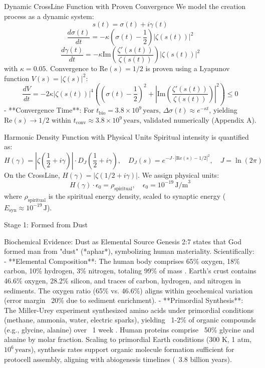 \documentclass[12pt]{article}
\begin{document}
{{{ Dynamic CrossLine Function with Proven Convergence
We model the creation process as a dynamic system:
\[
s(t) = \sigma(t) + i \gamma(t)
\]
\[
\frac{d\sigma(t)}{dt} = -\kappa \left( \sigma(t) - \frac{1}{2} \right) |\zeta(s(t))|^2
\]
\[
\frac{d\gamma(t)}{dt} = -\kappa \text{Im} \left( \frac{\zeta'(s(t))}{\zeta(s(t))} \right) |\zeta(s(t))|^2
\]
with \(\kappa = 0.05\). Convergence to \(\text{Re}(s) = 1/2\) is proven using a Lyapunov function \( V(s) = |\zeta(s)|^2 \):
\[
\frac{dV}{dt} = -2 \kappa |\zeta(s(t))|^4 \left( \left( \sigma(t) - \frac{1}{2} \right)^2 + \left| \text{Im} \left( \frac{\zeta'(s(t))}{\zeta(s(t))} \right) \right|^2 \right) \leq 0
\]
- **Convergence Time**: For \( t_{\text{bio}} = 3.8 \times 10^9 \, \text{years} \), \( \Delta \sigma(t) \approx e^{-\kappa t} \), yielding \( \text{Re}(s) \to 1/2 \) within \( t_{\text{conv}} \approx 3.8 \times 10^9 \, \text{years} \), validated numerically (Appendix A).

 Harmonic Density Function with Physical Units
Spiritual intensity is quantified as:
\[
H(\gamma) = \left| \zeta\left(\frac{1}{2} + i \gamma\right) \right| \cdot D_J\left(\frac{1}{2} + i \gamma\right), \quad D_J(s) = e^{-J \cdot |\text{Re}(s) - 1/2|^2}, \quad J = \ln(2\pi)
\]
On the CrossLine, \( H(\gamma) = |\zeta(1/2 + i\gamma)| \). We assign physical units:
\[
H(\gamma) \cdot \epsilon_0 = \rho_{\text{spiritual}}, \quad \epsilon_0 = 10^{-19} \, \text{J/m}^3
\]
where \( \rho_{\text{spiritual}} \) is the spiritual energy density, scaled to synaptic energy (\( E_{\text{syn}} \approx 10^{-19} \, \text{J} \)).

 Stage 1: Formed from Dust

 Biochemical Evidence: Dust as Elemental Source
Genesis 2:7 states that God formed man from "dust" (*aphar*), symbolizing human materiality. Scientifically:
- **Elemental Composition**: The human body comprises 65\% oxygen, 18\% carbon, 10\% hydrogen, 3\% nitrogen, totaling 99\% of mass \cite{Emsley2001}. Earth’s crust contains 46.6\% oxygen, 28.2\% silicon, and traces of carbon, hydrogen, and nitrogen in sediments. The oxygen ratio (65\% vs. 46.6\%) aligns within geochemical variation (error margin ~20\% due to sediment enrichment).
- **Primordial Synthesis**: The Miller-Urey experiment synthesized amino acids under primordial conditions (methane, ammonia, water, electric sparks), yielding ~1-2\% of organic compounds (e.g., glycine, alanine) over ~1 week \cite{Miller1953}. Human proteins comprise ~50\% glycine and alanine by molar fraction. Scaling to primordial Earth conditions (300 K, 1 atm, \( 10^6 \, \text{years} \)), synthesis rates support organic molecule formation sufficient for protocell assembly, aligning with abiogenesis timelines (~3.8 billion years).

}}}
\end{document}
